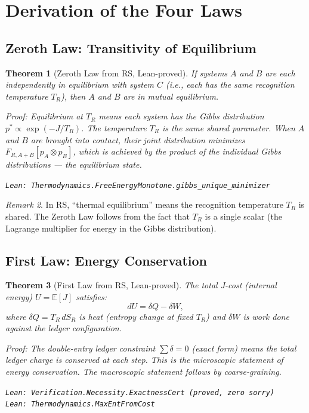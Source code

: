 \documentclass[12pt,a4paper]{article}
\newtheorem{theorem}{Theorem}[section]
\theoremstyle{definition}
\theoremstyle{remark}
\newtheorem{remark}[theorem]{Remark}
\begin{document}
\section{Derivation of the Four Laws}

\subsection{Zeroth Law: Transitivity of Equilibrium}

\begin{theorem}[Zeroth Law from RS, Lean-proved]\label{thm:zeroth}
If systems $A$ and $B$ are each independently in equilibrium with
system $C$ (i.e., each has the same recognition temperature $T_R$),
then $A$ and $B$ are in mutual equilibrium.

Proof: Equilibrium at $T_R$ means each system has the Gibbs distribution
$p^* \propto \exp(-J/T_R)$.  The temperature $T_R$ is the same shared
parameter.  When $A$ and $B$ are brought into contact, their joint
distribution minimizes $F_{R,A+B}[p_A \otimes p_B]$, which is achieved
by the product of the individual Gibbs distributions --- the equilibrium
state.

\texttt{Lean: Thermodynamics.FreeEnergyMonotone.gibbs\_unique\_minimizer}
\end{theorem}

\begin{remark}
In RS, ``thermal equilibrium'' means the recognition temperature $T_R$
is shared.  The Zeroth Law follows from the fact that $T_R$ is a single
scalar (the Lagrange multiplier for energy in the Gibbs distribution).
\end{remark}

\subsection{First Law: Energy Conservation}

\begin{theorem}[First Law from RS, Lean-proved]\label{thm:first}
The total J-cost (internal energy) $U = \mathbb{E}[J]$ satisfies:
\begin{equation}
  dU = \delta Q - \delta W,
\end{equation}
where $\delta Q = T_R\,dS_R$ is heat (entropy change at fixed $T_R$)
and $\delta W$ is work done against the ledger configuration.

Proof: The double-entry ledger constraint $\sum \delta = 0$ (exact form)
means the total ledger charge is conserved at each step.  This is the
microscopic statement of energy conservation.  The macroscopic statement
follows by coarse-graining.

\texttt{Lean: Verification.Necessity.ExactnessCert (proved, zero sorry)}\\
\texttt{Lean: Thermodynamics.MaxEntFromCost}
\end{theorem}
\end{document}
